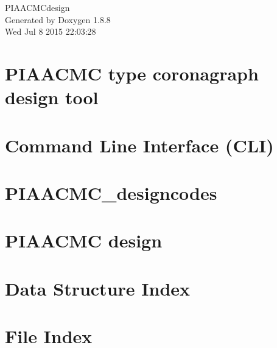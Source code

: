 \documentclass[twoside]{book}
\newcommand{\+}{\discretionary{\mbox{\scriptsize$\hookleftarrow$}}{}{}}
\newcommand{\clearemptydoublepage}{%
  \newpage{\pagestyle{empty}\cleardoublepage}%
}
\begin{document}
\hypersetup{pageanchor=false,
             bookmarks=true,
             bookmarksnumbered=true,
             pdfencoding=unicode
            }
\begin{titlepage}
\vspace*{7cm}
\begin{center}%
{\Large P\+I\+A\+A\+C\+M\+Cdesign }\\
\vspace*{1cm}
{\large Generated by Doxygen 1.8.8}\\
\vspace*{0.5cm}
{\small Wed Jul 8 2015 22:03:28}\\
\end{center}
\end{titlepage}
\clearemptydoublepage
\tableofcontents
\clearemptydoublepage
{}
\hypersetup{pageanchor=true}

\chapter{P\+I\+A\+A\+C\+M\+C type coronagraph design tool}
\label{md_README}
\hypertarget{md_README}{}

\chapter{Command Line Interface (C\+L\+I)}
\label{md_src_CLIcore}
\hypertarget{md_src_CLIcore}{}

\chapter{P\+I\+A\+A\+C\+M\+C\+\_\+designcodes}
\label{md_src_PIAACMCsimul_PIAACMC_designcodes}
\hypertarget{md_src_PIAACMCsimul_PIAACMC_designcodes}{}

\chapter{P\+I\+A\+A\+C\+M\+C design}
\label{md_src_PIAACMCsimul_README}
\hypertarget{md_src_PIAACMCsimul_README}{}

\chapter{Data Structure Index}

\chapter{File Index}

\end{document}
